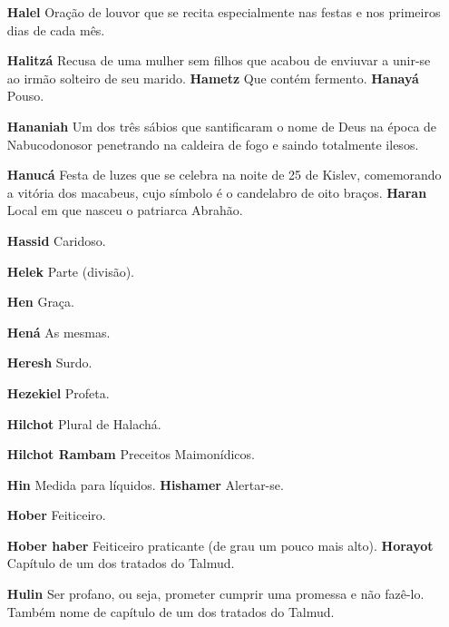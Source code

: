 \begin{itemize}
\begin{enumrate}
\begin{itemize}
\begin{itemize}
\begin{itemize}
\begin{itemize}
\begin{itemize}
\item[\textbf{Halel}] Oração de louvor que se reci­ta especialmente nas
festas e nos pri­meiros dias de cada mês.

\item[\textbf{Halitzá}] Recusa de uma mulher sem filhos que acabou de
enviuvar a unir-se ao irmão solteiro de seu marido. \textbf{Hametz}
Que contém fermento. \textbf{Hanayá} Pouso.

\item[\textbf{Hananiah}] Um dos três sábios que santificaram o nome de Deus
na épo­ca de Nabucodonosor penetrando na caldeira de fogo e saindo
totalmente ilesos.

\item[\textbf{Hanucá}] Festa de luzes que se cele­bra na noite de 25 de
Kislev, comemo­rando a vitória dos macabeus, cujo símbolo é o candelabro
de oito braços. \textbf{Haran} Local em que nasceu o patriar­ca
Abrahão.

\item[\textbf{Hassid}] Caridoso.

\item[\textbf{Helek}] Parte (divisão).

\item[\textbf{Hen}] Graça.

\item[\textbf{Hená}] As mesmas.

\item[\textbf{Heresh}] Surdo.

\item[\textbf{Hezekiel}] Profeta.

\item[\textbf{Hilchot}] Plural de Halachá.

\item[\textbf{Hilchot Rambam}] Preceitos Maimo­nídicos.

\item[\textbf{Hin} Medida para líquidos. \textbf{Hishamer}] Alertar-se.

\item[\textbf{Hober}] Feiticeiro.

\item[\textbf{Hober haber}] Feiticeiro praticante (de grau um pouco mais
alto). \textbf{Horayot} Capítulo de um dos trata­dos do Talmud.

\item[\textbf{Hulin}] Ser profano, ou seja, prome­ter cumprir uma promessa e
não fazê-lo. Também nome de capítulo de um dos tratados do Talmud.


\end{itemize}
\end{itemize}
\end{itemize}
\end{itemize}
\end{itemize}
\end{enumrate}
\end{itemize}
